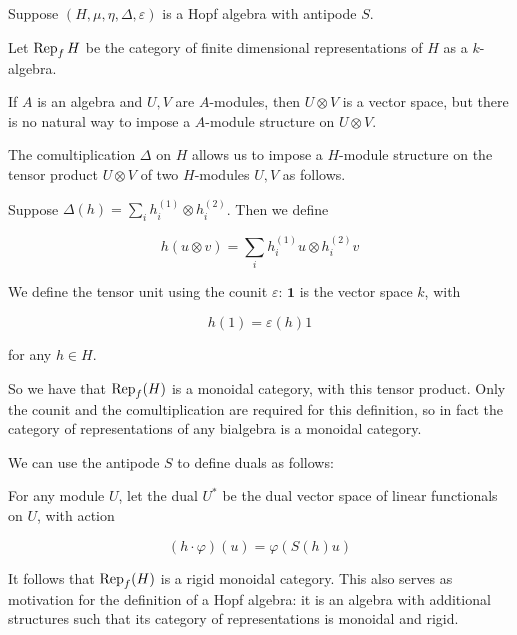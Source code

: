 Suppose $(H, \mu, \eta, \Delta, \varepsilon)$ is a Hopf algebra with antipode $S$. 

Let $\operatorname{Rep}_f H$ be the category of finite dimensional representations of $H$ as
a $k$-algebra.

If $A$ is an algebra and $U, V$ are $A$-modules, then $U \otimes V$ is a vector
space, but there is no natural way to impose a $A$-module structure on $U
\otimes V$. 

The comultiplication $\Delta$ on $H$ allows us to impose a $H$-module structure
on the tensor product $U \otimes V$ of two $H$-modules $U,V$ as follows.

Suppose $\Delta(h) = \sum _{i} h^{(1)}_i \otimes h^{(2)}_i$. Then we define

\begin{equation}
    h (u \otimes v) = \sum_{i} h^{(1)}_i u \otimes h^{(2)}_i v
\end{equation}

We define the tensor unit using the counit $\varepsilon$: $\mathbf{1}$ is the
vector space $k$, with 

\begin{equation}
    h(1) = \varepsilon(h) 1
\end{equation}

 for any $h\in H$.

So we have that $\operatorname{Rep}_f(H)$ is a monoidal category, with this tensor product.
Only the counit and the comultiplication are required for this definition, so
in fact the category of representations of any bialgebra is a monoidal
category.

We can use the antipode $S$ to define duals as follows:

For any module $U$, let the dual $U^*$ be the dual vector space of linear
functionals on $U$, with action

\begin{equation}
    (h\cdot \varphi)(u)  = \varphi(S(h) u)
\end{equation}

It follows that $\operatorname{Rep}_f(H)$ is a rigid monoidal category. This also serves as
motivation for the definition of a Hopf algebra: it is an algebra with
additional structures such that its category of representations is monoidal and
rigid. 



